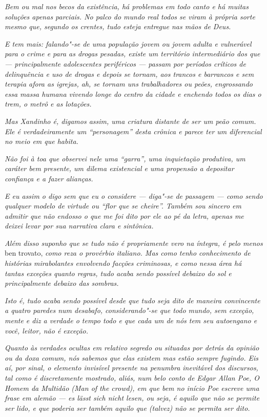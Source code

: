 \emph{Bem ou mal nos becos da existência, há problemas em todo canto e
há muitas soluções apenas parciais. No palco do mundo real todos se
viram à própria sorte mesmo que, segundo os crentes, tudo esteja
entregue nas mãos de Deus.}

\emph{E tem mais: falando"-se de uma população jovem ou jovem adulta e
vulnerável para o crime e para as drogas pesadas, existe um território
intermediário dos que --- principalmente adolescentes periféricos ---
passam por períodos críticos de delinquência e uso de drogas e depois se
tornam, aos trancos e barrancos e sem terapia afora as igrejas, ah, se
tornam uns trabalhadores ou peões, engrossando essa massa humana vivendo
longe do centro da cidade e enchendo todos os dias o trem, o metrô e as
lotações.}

\emph{Mas Xandinho é, digamos assim, uma criatura distante de ser um
peão comum. Ele é verdadeiramente um ``personagem'' desta crônica e
parece ter um diferencial no meio em que habita.}

\emph{Não foi à toa que observei nele uma ``garra'', uma inquietação
produtiva, um caráter bem presente, um dilema existencial e uma
propensão a depositar confiança e a fazer alianças.}

\emph{E eu assim o digo sem que eu o considere --- diga"-se de passagem
--- como sendo qualquer modelo de virtude ou ``flor que se cheire''.
Também sou sincero em admitir que não endosso o que me foi dito por ele
ao pé da letra, apenas me deixei levar por sua narrativa clara e
sintônica.}

\emph{Além disso suponho que se tudo não é propriamente vero na íntegra,
é pelo menos} ben trovato, \emph{como reza o provérbio italiano. Mas como tenho
conhecimento de histórias mirabolantes envolvendo facções criminosas, e
como nessa área há tantas exceções quanto regras, tudo acaba sendo
possível debaixo do sol e principalmente debaixo das sombras.}

\emph{Isto é, tudo acaba sendo possível desde que tudo seja dito de
maneira convincente a quatro paredes num desabafo, considerando"-se que
todo mundo, sem exceção, mente e diz a verdade o tempo todo e que cada
um de nós tem seu autoengano e você, leitor, não é exceção.}

\emph{Quanto às verdades ocultas em relativo segredo ou situadas por
detrás da opinião ou da doxa comum, nós sabemos que elas existem mas
estão sempre fugindo. Eis aí, por sinal, o elemento invisível presente
na penumbra inevitável dos discursos, tal como é discretamente mostrado,
aliás, num belo conto de Edgar Allan Poe, O Homem da Multidão (Man of
the crowd), em que bem no início Poe escreve uma frase em alemão --- es
lässt sich nicht lesen, ou seja, é aquilo que não se permite ser lido, e
que poderia ser também aquilo que (talvez) não se permita ser dito.}

